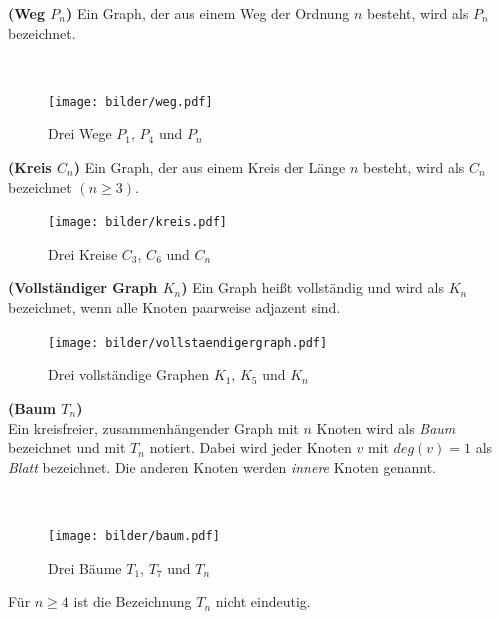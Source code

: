 \begin{defi}{\textbf{(Weg $P_n$)}}\newline
Ein Graph, der aus einem Weg der Ordnung $n$ besteht, wird als $P_n$ bezeichnet. \end{defi}
~\linebreak
\begin{figure}[h!]
		\centering 		 
   \texttt{[image: bilder/weg.pdf]}
	\caption{Drei Wege $P_1$, $P_4$ und $P_n$}
  	 \end{figure}

\begin{defi}{\textbf{(Kreis $C_n$)}}\newline
Ein Graph, der aus einem Kreis der Länge $n$ besteht, wird als $C_n$ bezeichnet $(n \geq 3)$. \end{defi}
\begin{figure}[h!]
		\centering 		 
   \texttt{[image: bilder/kreis.pdf]}
	\caption{Drei Kreise $C_3$, $C_6$ und $C_n$}
  	 \end{figure}
\begin{defi}{\textbf{(Vollständiger Graph $K_n$)}}\newline
Ein Graph heißt vollständig und wird als $K_n$ bezeichnet, wenn alle Knoten paarweise adjazent sind.
\end{defi}
\begin{figure}[h!]
		\centering 		 
   \texttt{[image: bilder/vollstaendigergraph.pdf]}
	\caption{Drei vollständige Graphen $K_1$, $K_5$ und $K_n$}
  	 \end{figure}

\begin{defi}{\textbf{(Baum $T_n$)}}\\
Ein kreisfreier, zusammenhängender Graph mit $n$ Knoten wird als \emph{Baum} bezeichnet und mit $T_n$ notiert. Dabei wird jeder Knoten $v$ mit $deg(v)=1$ als \emph{Blatt} bezeichnet. Die anderen Knoten werden \emph{innere} Knoten genannt. \end{defi}
~\linebreak
\vspace{-7mm}
\begin{figure}[h!]
		\centering 		 
   \texttt{[image: bilder/baum.pdf]}
	\caption{Drei Bäume $T_{1}$, $T_{7}$ und $T_{n}$}
  	 \end{figure}
\begin{bem}
Für $n \geq 4$ ist die Bezeichnung $T_n$ nicht eindeutig.  
\end{bem}

